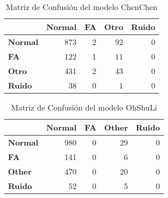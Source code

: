         
        \begin{table}[H]
        \caption{Matriz de Confusión del modelo ChenChen}
        \begin{center}
        \begin{tabular}{|l|r|r|r|r|}
        \hline
         & \multicolumn{1}{l|}{\textbf{Normal}} & \multicolumn{1}{l|}{\textbf{FA}} & \multicolumn{1}{l|}{\textbf{Otro}} & \multicolumn{1}{l|}{\textbf{Ruido}} \\ \hline
        \textbf{Normal} & 873 & 2 & 92 & 0 \\ \hline
        \textbf{FA} & 122 & 1 & 11 & 0 \\ \hline
        \textbf{Otro} & 431 & 2 & 43 & 0 \\ \hline
        \textbf{Ruido} & 38 & 0 & 1 & 0 \\ \hline
        \end{tabular}
        \end{center}
        \label{table:ChenChen_CM}
        \end{table}
        
        \begin{table}[H]
        \caption{Matriz de Confusión del modelo OhShuLi}
        \begin{center}
        \begin{tabular}{|l|r|r|r|r|}
        \hline
         & \multicolumn{1}{l|}{\textbf{Normal}} & \multicolumn{1}{l|}{\textbf{FA}} & \multicolumn{1}{l|}{\textbf{Other}} & \multicolumn{1}{l|}{\textbf{Ruido}} \\ \hline
        \textbf{Normal} & 980 & 0 & 29 & 0 \\ \hline
        {\textbf{FA}} & 141 & 0 & 6 & 0 \\ \hline
        \textbf{Other} & 470 & 0 & 20 & 0 \\ \hline
        \textbf{Ruido} & 52 & 0 & 5 & 0 \\ \hline
        \end{tabular}
        \end{center}
        \label{cm_ohsuli}
        \end{table}

